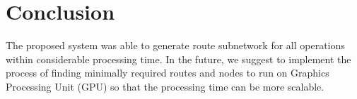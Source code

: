 \documentclass[conference]{IEEEtran}
\begin{document}



\section{Conclusion}

The proposed system was able to generate route subnetwork for all operations within considerable processing time. In the future, we suggest to implement the process of finding minimally required routes and nodes to run on Graphics Processing Unit (GPU) so that the processing time can be more scalable.
\end{document}
